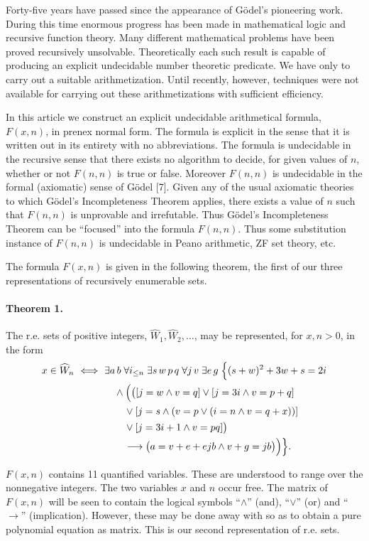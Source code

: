 \documentclass[11pt,a4paper]{article}
\newcommand{\origpage}[1]{\marginnote{\footnotesize\textbf{[#1]}}}
\newcommand{\WW}{\widehat W}
\begin{document}
Forty-five years have passed since the appearance of Gödel's pioneering work. During this time enormous progress has been made in mathematical logic and recursive function theory. Many different mathematical problems have been proved recursively unsolvable. Theoretically each such result is capable of producing an explicit undecidable number theoretic predicate. We have only to carry out a suitable arithmetization. Until recently, however, techniques were not available for carrying out these arithmetizations with sufficient efficiency.

In this article we construct an explicit undecidable arithmetical formula, $F(x, n)$, in prenex normal form. The formula is explicit in the sense that it is written out in its entirety with no abbreviations. The formula is undecidable in the recursive sense that there exists no algorithm to decide, for given values of $n$, whether or not $F(n, n)$ is true or false. Moreover $F(n, n)$ is undecidable in the formal (axiomatic) sense of Gödel [7]. Given any of the usual axiomatic theories to which Gödel's Incompleteness Theorem applies, there exists a value of $n$ such that $F(n, n)$ is unprovable and irrefutable. Thus Gödel's Incompleteness Theorem can be ``focused'' into the formula $F(n, n)$. Thus some substitution instance of $F(n, n)$ is undecidable in Peano arithmetic, ZF set theory, etc.

The formula $F(x, n)$ is given in the following theorem, the first of our three representations of recursively enumerable sets.

\paragraph{Theorem 1.}\origpage{336}
The r.e. sets of positive integers, $\WW_1,\WW_2,\ldots$, may be represented,
for $x,n>0$, in the form
\[
\begin{aligned}
x\in\WW_n\ \Longleftrightarrow\ {}
&\exists a\,b\;\forall i_{\le n}\;\exists s\,w\,p\,q\;\forall j\,v\;\exists e\,g\;\Bigl\{
(s+w)^2+3w+s=2i\\
&\quad\wedge\Bigl(\bigl([j=w\wedge v=q]\vee[j=3i\wedge v=p+q]\\
&\qquad\vee[j=s\wedge(v=p\vee(i=n\wedge v=q+x))]\\
&\qquad\vee[j=3i+1\wedge v=pq]\bigr)\\
&\qquad\longrightarrow\bigl(a=v+e+ejb\wedge v+g=jb\bigr)\Bigr)\Bigr\}.
\end{aligned}
\]

$F(x, n)$ contains 11 quantified variables. These are understood to range over the nonnegative integers. The two variables $x$ and $n$ occur free. The matrix of $F(x, n)$ will be seen to contain the logical symbols ``$\wedge$'' (and), ``$\vee$'' (or) and ``$\longrightarrow$'' (implication). However, these may be done away with so as to obtain a pure polynomial equation as matrix. This is our second representation of r.e. sets.
\end{document}
